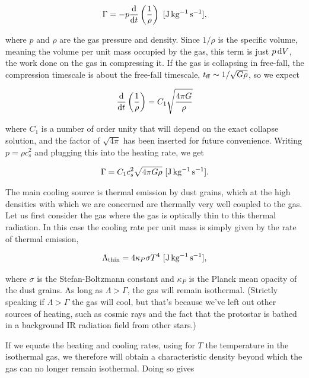\documentclass[a4paper,10pt]{article}
\begin{document}
\begin{align*}
    \Gamma = -p \frac{{\rm d}}{{\rm d}t} \left(\frac{1}{\rho}\right) ~ [{\rm J\,kg^{-1}\,s^{-1}}],
\end{align*}

{\noindent}where $p$ and $\rho$ are the gas pressure and density. Since $1/\rho$ is the specific volume, meaning the volume per unit mass occupied by the gas, this term is just $p\,{\rm d}V$, the work done on the gas in compressing it. If the gas is collapsing in free-fall, the compression timescale is about the free-fall timescale, $t_{\rm ff} \sim 1/\sqrt{G\rho}$, so we expect 

\begin{align*}
    \frac{{\rm d}}{{\rm d}t} \left(\frac{1}{\rho}\right) = C_1 \sqrt{\frac{4\pi G}{\rho}} 
\end{align*}

{\noindent}where $C_1$ is a number of order unity that will depend on the exact collapse solution, and the factor of $\sqrt{4\pi}$ has been inserted for future convenience. Writing $p=\rho c_s^2$ and plugging this into the heating rate, we get

\begin{align*}
    \Gamma = C_1c_s^2 \sqrt{4\pi G\rho} ~ [{\rm J\,kg^{-1}\,s^{-1}}].
\end{align*}

{\noindent}The main cooling source is thermal emission by dust grains, which at the high densities with which we are concerned are thermally very well coupled to the gas. Let us first consider the gas where the gas is optically thin to this thermal radiation. In this case the cooling rate per unit mass is simply given by the rate of thermal emission,

\begin{align*}
    \Lambda_{\rm thin} = 4\kappa_P\sigma T^4 ~ [{\rm J\,kg^{-1}\,s^{-1}}],
\end{align*}

{\noindent}where $\sigma$ is the Stefan-Boltzmann constant and $\kappa_P$ is the Planck mean opacity of the dust grains. As long as $\Lambda>\Gamma$, the gas will remain isothermal. (Strictly speaking if $\Lambda>\Gamma$ the gas will cool, but that's because we've left out other sources of heating, such as cosmic rays and the fact that the protostar is bathed in a background IR radiation field from other stars.)

{\noindent}If we equate the heating and cooling rates, using for $T$ the temperature in the isothermal gas, we therefore will obtain a characteristic density beyond which the gas can no longer remain isothermal. Doing so gives
\end{document}
